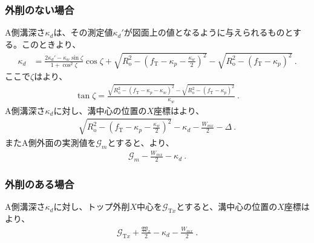 \subsubsection{外削のない場合}
A側溝深さ$\kappa_d$は、その測定値$\kappa_d'$が図面上の値となるように与えられるものとする。このときより、
\begin{align*}
  \kappa_d
  &= \frac{2\kappa_d'-\kappa_w\sin\zeta}{1+\cos^2\zeta}\cos\zeta
     +\sqrt{R_\mathrm o^2-\left(f_\mathrm T-\kappa_p-\frac{\kappa_w}2\right)^{\!2}}
     -\sqrt{R_\mathrm o^2-\left(f_\mathrm T-\kappa_p\right)^2}\ .
\end{align*}
ここで$\zeta$はより、
\begin{align*}
  \tan\zeta
  = \frac{\sqrt{R_\mathrm o^2-\left(f_\mathrm T-\kappa_p-\kappa_w\right)^2}
          -\sqrt{R_\mathrm o^2-\left(f_\mathrm T-\kappa_p\right)^2}}
         {\kappa_w}\ .
\end{align*}
A側溝深さ$\kappa_d$に対し、溝中心の位置の$X$座標はより、
\begin{align*}
  \sqrt{R_\mathrm o^2-\left(f_\mathrm T-\kappa_p-\frac{\kappa_w}2\right)^{\!2}}-\kappa_d-\frac{W_{mx}}2
  -\varDelta\ .
\end{align*}
またA側外面の実測値を$\mathcal G_m$とすると、より、
\begin{align*}
  \mathcal G_m-\frac{W_{mx}}2-\kappa_d\ .
\end{align*}

\subsubsection{外削のある場合}
A側溝深さ$\kappa_d$に対し、トップ外削$X$中心を$\mathcal G_{\mathrm Tx}$とすると、溝中心の位置の$X$座標はより、
\begin{align*}
  \mathcal G_{\mathrm Tx}+\frac{\mathfrak W_x}2-\kappa_d-\frac{W_{mx}}2\ .
\end{align*}



